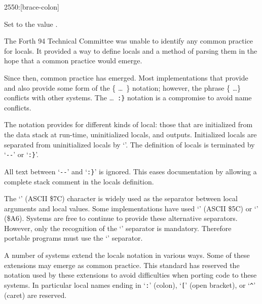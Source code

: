 \begin{worddef}[b:]{2550}{\brace:}[brace-colon]
\item[\uline{\emph{name} Interpretation}]

	Set  to the value .


	\begin{rationale} %
		The Forth 94 Technical Committee was unable to identify any
		common practice for locals.  It provided a way to define locals
		and a method of parsing them in the hope that a common practice
		would emerge.

		Since then, common practice has emerged.  Most implementations that
		provide  and \linebreak[1]  also provide some form of the
		\{ \ldots\ \} notation; however, the phrase \{ \ldots \} conflicts with
		other systems.  The  \ldots\ \texttt{:\}} notation is a compromise
		to avoid name conflicts.

		The notation provides for different kinds of local: those that are
		initialized from the data stack at run-time, uninitialized locals, and
		outputs.  Initialized locals are separated from uninitialized locals by
		`\texttt{\textbar}'.  The definition of locals is terminated by
		`\texttt{-{}-}' or `\texttt{:\}}'.

		All text between `\texttt{-{}-}' and `\texttt{:\}}' is ignored.  This eases
		documentation by allowing a complete stack comment in the locals definition.

		The `\texttt{\textbar}' (ASCII \$7C) character is widely used as the
		separator between local arguments and local values.  Some implementations
		have used `\texttt{\bs}' (ASCII \$5C) or `\texttt{\textbrokenbar}' (\$A6).
		Systems are free to continue to provide these alternative separators.
		However, only the recognition of the `\texttt{\textbar}' separator is
		mandatory. Therefore portable programs must use the `\texttt{\textbar}'
		separator.

		A number of systems extend the locals notation in various ways.  Some of
		these extensions may emerge as common practice.  This standard has reserved
		the notation used by these extensions to avoid difficulties when porting
		code to these systems.  In particular local names ending in
		`\texttt{:}' (colon),
		`\texttt{[}' (open bracket), or
		`\texttt{\textasciicircum}' (caret) are reserved.
	\end{rationale}


\end{worddef}
